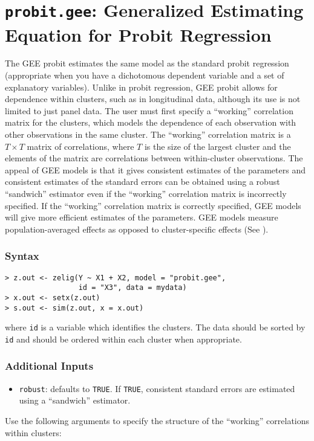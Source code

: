 


\section{\texttt{probit.gee}: Generalized Estimating Equation for Probit Regression}
\label{probit.gee}

The GEE probit estimates the same model as the standard probit
regression (appropriate when you have a dichotomous dependent
variable and a set of explanatory variables).  Unlike in probit
regression, GEE probit allows for dependence within clusters, such as
in longitudinal data, although its use is not limited to just
panel data.  The user must first specify a ``working''
correlation matrix for the clusters, which models the dependence of each observation with other observations in the same cluster.  The ``working'' correlation matrix is a $T \times T$ matrix of correlations, where $T$ is the size of the largest cluster and the elements of the matrix are correlations between within-cluster observations.  The appeal of GEE models is that it gives consistent estimates of the parameters and consistent estimates of
the standard errors can be obtained using a robust ``sandwich''
estimator even if the ``working'' correlation matrix is incorrectly
specified.  If the ``working'' correlation matrix is correctly specified, GEE models will give more efficient estimates of the parameters.  GEE models measure  population-averaged effects as opposed to cluster-specific effects (See \citet{Zorn01}).    

\subsubsection{Syntax}

\begin{verbatim}
> z.out <- zelig(Y ~ X1 + X2, model = "probit.gee",
                 id = "X3", data = mydata)
> x.out <- setx(z.out)
> s.out <- sim(z.out, x = x.out)
\end{verbatim}

\noindent where \texttt{id} is a variable which identifies the clusters.  The data should be sorted by \texttt{id} and should be ordered within each cluster when appropriate.

\subsubsection{Additional Inputs}

\begin{itemize}
\item \texttt{robust}: defaults to \texttt{TRUE}.  If \texttt{TRUE}, consistent standard errors are estimated using a ``sandwich'' estimator.
\end{itemize}
Use the following arguments to specify the structure of the ``working'' correlations within clusters:

